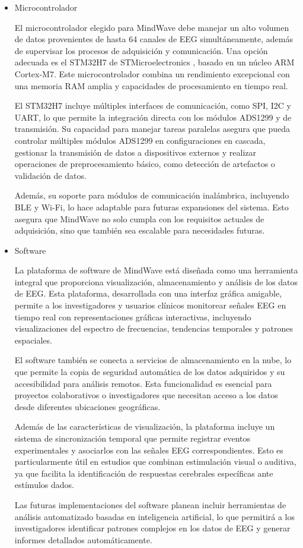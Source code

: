 \begin{itemize}
    \item Microcontrolador

El microcontrolador elegido para MindWave debe manejar un alto volumen de datos provenientes de hasta 64 canales de EEG simultáneamente, además de supervisar los procesos de adquisición y comunicación. Una opción adecuada es el STM32H7 de STMicroelectronics \cite{STMicroelectronics_STM32H7}, basado en un núcleo ARM Cortex-M7. Este microcontrolador combina un rendimiento excepcional con una memoria RAM amplia y capacidades de procesamiento en tiempo real.

El STM32H7 incluye múltiples interfaces de comunicación, como SPI, I2C y UART, lo que permite la integración directa con los módulos ADS1299 y de transmisión. Su capacidad para manejar tareas paralelas asegura que pueda controlar múltiples módulos ADS1299 en configuraciones en cascada, gestionar la transmisión de datos a dispositivos externos y realizar operaciones de preprocesamiento básico, como detección de artefactos o validación de datos.

Además, su soporte para módulos de comunicación inalámbrica, incluyendo BLE y Wi-Fi, lo hace adaptable para futuras expansiones del sistema. Esto asegura que MindWave no solo cumpla con los requisitos actuales de adquisición, sino que también sea escalable para necesidades futuras.

    \item Software

La plataforma de software de MindWave está diseñada como una herramienta integral que proporciona visualización, almacenamiento y análisis de los datos de EEG. Esta plataforma, desarrollada con una interfaz gráfica amigable, permite a los investigadores y usuarios clínicos monitorear señales EEG en tiempo real con representaciones gráficas interactivas, incluyendo visualizaciones del espectro de frecuencias, tendencias temporales y patrones espaciales.

El software también se conecta a servicios de almacenamiento en la nube, lo que permite la copia de seguridad automática de los datos adquiridos y su accesibilidad para análisis remotos. Esta funcionalidad es esencial para proyectos colaborativos o investigadores que necesitan acceso a los datos desde diferentes ubicaciones geográficas.

Además de las características de visualización, la plataforma incluye un sistema de sincronización temporal que permite registrar eventos experimentales y asociarlos con las señales EEG correspondientes. Esto es particularmente útil en estudios que combinan estimulación visual o auditiva, ya que facilita la identificación de respuestas cerebrales específicas ante estímulos dados.

Las futuras implementaciones del software planean incluir herramientas de análisis automatizado basadas en inteligencia artificial, lo que permitirá a los investigadores identificar patrones complejos en los datos de EEG y generar informes detallados automáticamente.

\end{itemize}


